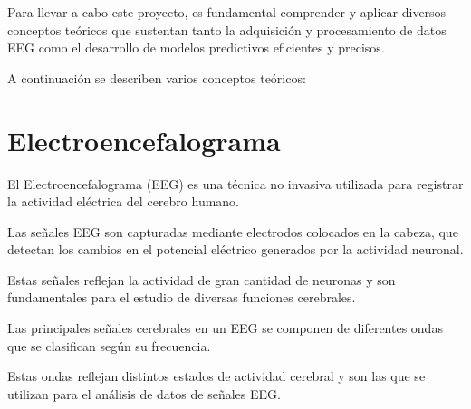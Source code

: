 
Para llevar a cabo este proyecto, es fundamental comprender y aplicar diversos conceptos teóricos que sustentan tanto la adquisición y procesamiento de datos EEG como el desarrollo de modelos predictivos eficientes y precisos. 

A continuación se describen varios conceptos teóricos:


\section{Electroencefalograma}

El Electroencefalograma (EEG) es una técnica no invasiva utilizada para registrar la actividad eléctrica del cerebro humano.

Las señales EEG son capturadas mediante electrodos colocados en la cabeza, que detectan los cambios en el potencial eléctrico generados por la actividad neuronal. 

Estas señales reflejan la actividad de gran cantidad de neuronas y son fundamentales para el estudio de diversas funciones cerebrales.



Las principales señales cerebrales en un EEG se componen de diferentes ondas que se clasifican según su frecuencia. 

Estas ondas reflejan distintos estados de actividad cerebral y son las que se utilizan para el análisis de datos de señales EEG.


